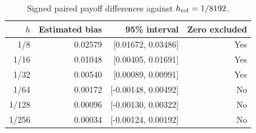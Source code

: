 \begin{table}[H]\centering\small
\caption{Signed paired payoff differences against $h_{\rm ref}=1/8192$.}
\begin{tabular}{rrrr}\toprule
$h$ & Estimated bias & 95\% interval & Zero excluded\\\midrule
1/8 & 0.02579 & [0.01672, 0.03486] & Yes\\
1/16 & 0.01048 & [0.00405, 0.01691] & Yes\\
1/32 & 0.00540 & [0.00089, 0.00991] & Yes\\
1/64 & 0.00172 & [-0.00148, 0.00492] & No\\
1/128 & 0.00096 & [-0.00130, 0.00322] & No\\
1/256 & 0.00034 & [-0.00124, 0.00192] & No\\
\bottomrule\end{tabular}
\end{table}
